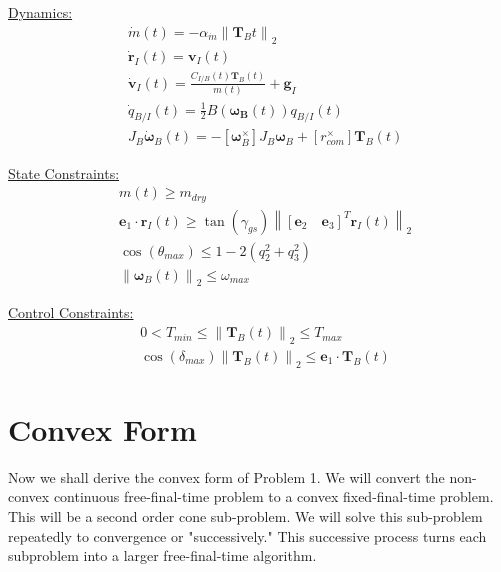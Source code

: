 \documentclass[conf]{new-aiaa}
\begin{document}
\begin{singlespace}
\begin{mdframed}
\underline{Dynamics:}  
\begin{align*}
& \dot{m}(t) = -\alpha_{\dot{m}} \left\lVert \mathbf{T}_B{t} \right\rVert _2 \\
& \dot{\mathbf{r}}_I(t) = \mathbf{v}_I(t) \\
& \dot{\mathbf{v}}_I(t) = \frac{C_{I/B}(t)\mathbf{T}_B(t)}{m(t)} + \mathbf{g}_I \\
 & \dot{q}_{B/I}(t) = \frac{1}{2} B(\bm{\omega_B}(t)) q_{B/I}(t) \\
& J_B \dot{\bm{\omega}}_B(t) = -\left[\bm{\omega}_B ^ \times\right] J_B \bm{\omega}_B + \left[r_{com}^\times \right]\mathbf{T}_B(t)
\end{align*}

\underline{State Constraints:}  
\begin{align*}
& m(t) \geq m_{dry} \\
& \mathbf{e}_1 \cdot \mathbf{r}_I(t) \geq \tan(\gamma_{gs}) \left\lVert \left[\mathbf{e}_2 \quad \mathbf{e}_3\right]^T \mathbf{r}_I(t) \right\lVert_2 \\
& \cos(\theta_{max}) \leq 1-2(q_{2}^{2}+q_{3}^{2}) \\
& \left \lVert \bm{\omega}_B(t) \right \lVert_2 \leq \omega_{max}
\end{align*}

\underline{Control Constraints:}  
\begin{align*}
& 0 < T_{min} \leq \left \lVert \bm{T}_B(t) \right \lVert_2 \leq T_{max} \\
& \cos(\delta_{max}) \left \lVert \bm{T}_B(t) \right \lVert_2 \leq \bm{e}_1 \cdot \bm{T}_B(t)
\end{align*}

\end{mdframed}




\section{Convex Form}
Now we shall derive the convex form of Problem 1. We will convert the non-convex continuous free-final-time problem to a convex fixed-final-time problem. This will be a second order cone sub-problem. We will solve this sub-problem repeatedly to convergence or "successively." This successive process turns each subproblem into a larger free-final-time algorithm.


\end{singlespace}
\end{document}
